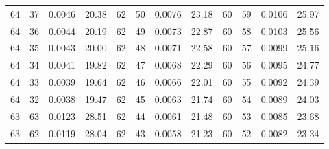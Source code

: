 \begin{tabular}{llll|llll|llll}
64 & 37 & 0.0046 & 20.38 & 62 & 50 & 0.0076 & 23.18 & 60 & 59 & 0.0106 & 25.97\\
64 & 36 & 0.0044 & 20.19 & 62 & 49 & 0.0073 & 22.87 & 60 & 58 & 0.0103 & 25.56\\
64 & 35 & 0.0043 & 20.00 & 62 & 48 & 0.0071 & 22.58 & 60 & 57 & 0.0099 & 25.16\\
64 & 34 & 0.0041 & 19.82 & 62 & 47 & 0.0068 & 22.29 & 60 & 56 & 0.0095 & 24.77\\
64 & 33 & 0.0039 & 19.64 & 62 & 46 & 0.0066 & 22.01 & 60 & 55 & 0.0092 & 24.39\\
64 & 32 & 0.0038 & 19.47 & 62 & 45 & 0.0063 & 21.74 & 60 & 54 & 0.0089 & 24.03\\
63 & 63 & 0.0123 & 28.51 & 62 & 44 & 0.0061 & 21.48 & 60 & 53 & 0.0085 & 23.68\\
63 & 62 & 0.0119 & 28.04 & 62 & 43 & 0.0058 & 21.23 & 60 & 52 & 0.0082 & 23.34\\
\bottomrule
\end{tabular}
\newpage
